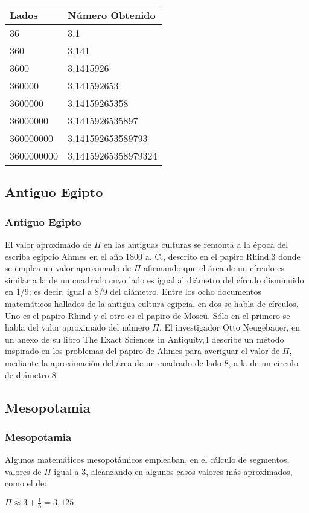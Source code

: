 \documentclass {beamer}
\begin{document}
\begin{frame}
\begin{tabular}{ll}

Lados & Número Obtenido\\
\hline
36 & 3,1\\
360 & 3,141\\
3600 & 3,1415926\\
360000 & 3,141592653\\
3600000 & 3,14159265358\\
36000000 & 3,1415926535897\\
360000000 & 3,141592653589793\\
3600000000 & 3,14159265358979324

\end{tabular}
\end{frame}

\subsection {Antiguo Egipto}
\begin{frame}
\frametitle {Antiguo Egipto}
El valor aproximado de $\Pi$ en las antiguas culturas se remonta a la época del escriba egipcio Ahmes en el año 1800 a. C., descrito en el papiro Rhind,3 donde se emplea un valor aproximado de $\Pi$ afirmando que el área de un círculo es similar a la de un cuadrado cuyo lado es igual al diámetro del círculo disminuido en 1/9; es decir, igual a 8/9 del diámetro.
Entre los ocho documentos matemáticos hallados de la antigua cultura egipcia, en dos se habla de círculos. Uno es el papiro Rhind y el otro es el papiro de Moscú. Sólo en el primero se habla del valor aproximado del número $\Pi$. El investigador Otto Neugebauer, en un anexo de su libro The Exact Sciences in Antiquity,4 describe un método inspirado en los problemas del papiro de Ahmes para averiguar el valor de $\Pi$, mediante la aproximación del área de un cuadrado de lado 8, a la de un círculo de diámetro 8.
\end{frame}
\subsection{Mesopotamia}
\begin{frame}
\frametitle{Mesopotamia}
Algunos matemáticos mesopotámicos empleaban, en el cálculo de segmentos, valores de $\Pi$ igual a 3, alcanzando en algunos casos valores más aproximados, como el de:
\centerline{$\Pi \approx 3 + \frac{1}{8} = 3,125$} 
\end{frame}
\end{document}
